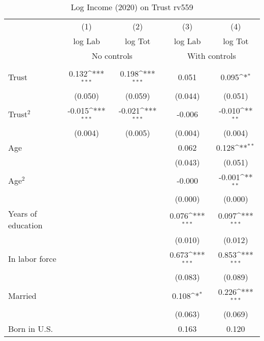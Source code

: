 \begin{table}[htbp]\centering
\def\sym#1{\ifmmode^{#1}\else\(^{#1}\)\fi}
\caption{Log Income (2020) on Trust rv559}
\begin{tabular}{l*{4}{c}}
\toprule
          &\multicolumn{1}{c}{(1)}&\multicolumn{1}{c}{(2)}&\multicolumn{1}{c}{(3)}&\multicolumn{1}{c}{(4)}\\
          &\multicolumn{1}{c}{log Lab}&\multicolumn{1}{c}{log Tot}&\multicolumn{1}{c}{log Lab}&\multicolumn{1}{c}{log Tot}\\
& \multicolumn{2}{c}{No controls} & \multicolumn{2}{c}{With controls} \\\\ \cmidrule(lr){2-3}\cmidrule(lr){4-5}
Trust     &    0.132\sym{***}&    0.198\sym{***}&    0.051         &    0.095\sym{*}  \\
          &  (0.050)         &  (0.059)         &  (0.044)         &  (0.051)         \\
Trust$^{2}$&   -0.015\sym{***}&   -0.021\sym{***}&   -0.006         &   -0.010\sym{**} \\
          &  (0.004)         &  (0.005)         &  (0.004)         &  (0.004)         \\
Age       &                  &                  &    0.062         &    0.128\sym{**} \\
          &                  &                  &  (0.043)         &  (0.051)         \\
Age$^{2}$ &                  &                  &   -0.000         &   -0.001\sym{**} \\
          &                  &                  &  (0.000)         &  (0.000)         \\
Years of education&                  &                  &    0.076\sym{***}&    0.097\sym{***}\\
          &                  &                  &  (0.010)         &  (0.012)         \\
In labor force&                  &                  &    0.673\sym{***}&    0.853\sym{***}\\
          &                  &                  &  (0.083)         &  (0.089)         \\
Married   &                  &                  &    0.108\sym{*}  &    0.226\sym{***}\\
          &                  &                  &  (0.063)         &  (0.069)         \\
Born in U.S.&                  &                  &    0.163         &    0.120         \\

\end{tabular}
\end{table}
